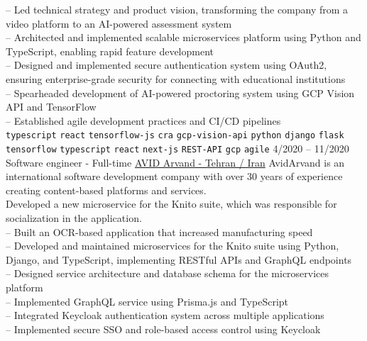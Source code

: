 \begin{entrylist}
{        -- Led technical strategy and product vision, transforming the company from a video platform to an AI-powered assessment system \\
        -- Architected and implemented scalable microservices platform using Python and TypeScript, enabling rapid feature development \\
        -- Designed and implemented secure authentication system using OAuth2, ensuring enterprise-grade security for connecting with educational institutions \\
        -- Spearheaded development of AI-powered proctoring system using GCP Vision API and TensorFlow \\
        -- Established agile development practices and CI/CD pipelines\\
        \texttt{typescript}\slashsep
        \texttt{react}\slashsep
        \texttt{tensorflow-js}\slashsep
        \texttt{cra}\slashsep
        \texttt{gcp-vision-api}\slashsep
        \texttt{python}\slashsep
        \texttt{django}\slashsep
        \texttt{flask}\slashsep
        \texttt{tensorflow}\slashsep
        \texttt{typescript}\slashsep
        \texttt{react}\slashsep
        \texttt{next-js}\slashsep
        \texttt{REST-API}\slashsep
        \texttt{gcp}\slashsep
        \texttt{agile}\slashsep
    }
    \entry
    {4/2020 -- 11/2020}
    {Software engineer - Full-time}
    {
        \href{https://www.linkedin.com/company/avid-technology-development/}{AVID Arvand - Tehran / Iran}}
    {
        AvidArvand is an international software development company with over 30 years of experience creating content-based platforms and services. \\
        Developed a new microservice for the Knito suite, which was responsible for socialization in the application.\\
        -- Built an OCR-based application that increased manufacturing speed \\
        -- Developed and maintained microservices for the Knito suite using Python, Django, and TypeScript, implementing RESTful APIs and GraphQL endpoints \\
        -- Designed service architecture and database schema for the microservices platform \\
        -- Implemented GraphQL service using Prisma.js and TypeScript \\
        -- Integrated Keycloak authentication system across multiple applications \\
        -- Implemented secure SSO and role-based access control using Keycloak \\
}
\end{entrylist}
